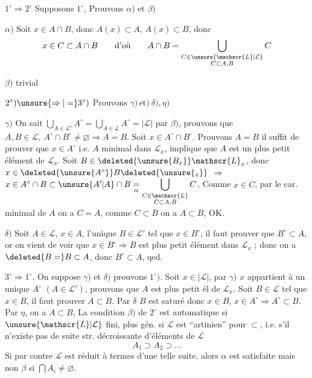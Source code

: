 $1^\circ\Rightarrow 2^\circ$ \quad Supposons $1^\circ$, Prouvons $\alpha)$ et $\beta)$

$\alpha)$ Soit $x\in A\cap B$, donc $A(x)\subset A$, $A(x)\subset B$, donc
\[
 x\in C\subset A\cap B\qquad\text{d'où}\qquad A\cap B=
 \bigcup_{\substack{C\in\unsure{\mathscr{L}|\mathcal{L}}\\C\subset A,B}}C
\]

$\beta)$ trivial

$2^\circ)\unsure{\Rightarrow|=}3^\circ)$ \quad Prouvons $\gamma)\,\text{et})\ \delta),\eta)$

$\gamma)$ On sait $\displaystyle\bigcup_{A\in\mathscr{L}'}A^\circ=\bigcup_{A\in\mathscr{L}}A^\circ=|\mathscr{L}|$ par $\beta)$, prouvons que $A,B\in\mathscr{L},\ A^\circ\cap B^\circ\ne\varnothing\Rightarrow A=B$. Soit $x\in A^\circ\cap B^\circ$. Prouvons $A=B$ il suffit de prouver que $x\in A^\circ$  i.e. $A$ minimal dans $\mathscr{L}_x$, implique que $A$ est un plus petit élément de $\mathscr{L}_x$. Soit $B\in\deleted{\unsure{B_x}}\mathscr{L}_x$, donc $x\in\deleted{\unsure{A^\circ}}B\deleted{\unsure{{}_x}}$  $\Rightarrow$ $x\in A^\circ\cap B\subset\unsure{A'|A}\cap B\underset{\alpha}{=}\displaystyle\bigcup_{\substack{C\in\mathscr{L}\\C\subset A,B}} C$,
Comme $x\in C$, par le car. minimal de $A$ on a $C=A$, comme $C\subset B$ on a $A\subset B$, OK.

$\delta)$ Soit $A\in\mathscr{L}$, $x\in A$,    l'unique $B\in\mathscr{L}'$ tel que $x\in B^\circ$, il faut prouver que $B^\circ\subset A$, or on vient de voir que  $x\in B^\circ\Rightarrow B$ est plus petit élément dans $\mathscr{L}_x$ ; donc on a $\deleted{B=}B\subset A$, donc $B^\circ\subset A$, qed.


$3^\circ\Rightarrow1^\circ$. \quad On suppose $\gamma)$ et $\delta)$ prouvons $1^\circ)$. Soit $x\in|\mathscr{L}|$, par $\gamma)$ $x$ appartient à un unique $A^\circ$  $(A\in\mathscr{L}')$, prouvons que $A$ est plus petit él de $\mathscr{L}_x$. Soit $B\in\mathscr{L}$ tel que $x\in B$, il faut prouver $A\subset B$.  Par $\delta$ $B$ est saturé donc $x\in B$, $x\in A^\circ\Rightarrow A^\circ\subset B$.  Par $\eta$, on a $A\subset B$,
\uline{}   La condition $\beta)$ de $2^\circ$ est automatique si $\unsure{\mathscr{L}|\mathcal{L}}$ fini, plus gén. si $\mathscr{L}$ est ``artinien'' pour $\subset$, i.e. s'il n'existe pas de suite str. décroissante d'éléments de $\mathscr{L}$
\[
 A_1\supset A_2\supset\ldots
\]
Si par contre $\mathscr{L}$ est réduit à   termes d'une telle suite,  alors $\alpha$ est satisfaite mais non $\beta$ si $\displaystyle\bigcap A_i\ne\varnothing$.

